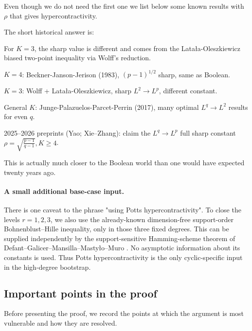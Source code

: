 \documentclass[11pt]{article}
\theoremstyle{definition}
\theoremstyle{remark}
\begin{document}
Even though we do not need the first one we list below some known results with $\rho$ that gives hypercontractivity.


The short historical answer is:

For $K=3$, the sharp value is different and comes from the Latała-Oleszkiewicz biased two-point inequality via Wolff's reduction.

$K=4$: Beckner-Janson-Jerison (1983), $(p-1)^{1/2}$ sharp, same as Boolean.

$K=3$: Wolff + Latała-Oleszkiewicz, sharp $L^2\to L^p$, different constant.

General $K$: Junge-Palazuelos-Parcet-Perrin (2017), many optimal $L^q \to L^2$ results for even $q$.

2025–2026 preprints (Yao; Xie–Zhang): claim the $L^q\to L^p$ full sharp constant $\rho=\sqrt{\frac{p-1}{q-1}}, K\ge 4$.

This is actually much closer to the Boolean world than one would have expected twenty years ago.

\paragraph{A small additional base-case input.}
There is one caveat to the phrase "using Potts hypercontractivity". To close the levels
$r=1,2,3$, we also use the already-known dimension-free support-order
Bohnenblust--Hille inequality, only in those three fixed degrees.  This can be
supplied independently by the support-sensitive Hamming-scheme theorem of
Defant--Galicer--Mansilla--Masty\l o--Muro \cite{DefantEtAlHamming}.  No
asymptotic information about its constants is used.  Thus Potts
hypercontractivity is the only cyclic-specific input in the high-degree
bootstrap.

\subsection{Important points in the proof}
\label{subsec:audit}

Before presenting the proof, we record the points at which the argument is
most vulnerable and how they are resolved.
\end{document}

